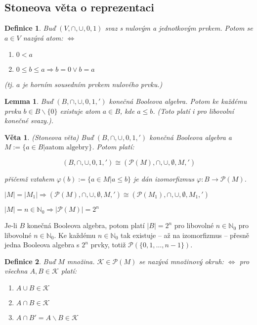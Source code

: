 \documentclass[a4paper, 11pt]{report}
\newtheorem{mydef}{Definice}[chapter]
\newtheorem{veta}{Věta}[chapter]
\newtheorem{lemma}{Lemma}[chapter]
\begin{document}
\subsection{Stoneova věta o reprezentaci}
\begin{mydef}
Buď $(V, \cap, \cup, 0, 1)$ svaz s nulovým a jednotkovým prvkem. Potom se $a \in V$ nazývá \emph{atom}: $\Leftrightarrow$
\begin{enumerate}[1)]
	\item $0 < a$
	\item $0 \leq b \leq a \Rightarrow b = 0 \lor b = a$
\end{enumerate}
(tj. $a$ je horním sousedním prvkem nulového prvku.)
\end{mydef}

\begin{lemma}
Buď $(B, \cap, \cup, 0, 1, ')$ konečná Booleova algebra. Potom ke každému prvku $b \in B \backslash \{0\}$ existuje atom $a \in B$, kde $a \leq b$. (Toto platí i pro libovolní konečné svazy.).
\end{lemma}

\begin{veta}
(Stoneova věta) Buď $(B, \cap, \cup, 0, 1, ')$ konečná Booleova algebra a $M := \{a \in B | a \text{atom algebry} \}$. Potom platí:

$$ (B, \cap, \cup, 0, 1, ') \cong (\mathcal{P}(M), \cap, \cup, \emptyset, M, ')$$

přičemž  vztahem $\varphi(b) := \{a \in M | a \leq b\}$ je dán izomorfizmus $\varphi: B \to \mathcal{P}(M)$.
\end{veta}

$|M| = |M_1| \Rightarrow (\mathcal{P}(M), \cap, \cup, \emptyset, M, ') \cong (\mathcal{P}(M_1), \cap, \cup, \emptyset, M_1, ')$

$|M| = n \in \mathbb{N}_0 \Rightarrow |\mathcal{P}(M)| = 2^n$

Je-li $B$ konečná Booleova algebra, potom platí $|B| = 2^n$ pro libovolné $n \in \mathbb{N}_0$ pro libovolné $n \in \mathbb{N}_0$. Ke každému $n \in \mathbb{N}_0$ tak existuje -- až na izomorfizmus -- přesně jedna Booleova algebra s $2^n$ prvky, totiž $\mathcal{P}(\{0, 1, \dots, n-1\})$.

\begin{mydef}
Buď $M$ množina.  $\mathcal{K} \in \mathcal{P}(M)$ se nazývá množinový okruh: $\Leftrightarrow$ pro všechna $A, B \in \mathcal{K}$ platí:
\begin{enumerate}[1)]
	\item $A \cup B \in \mathcal{K}$
	\item $A \cap B \in \mathcal{K}$
	\item $A \cap B' = A \backslash B \in \mathcal{K}$
\end{enumerate}
\end{mydef}
\end{document}
